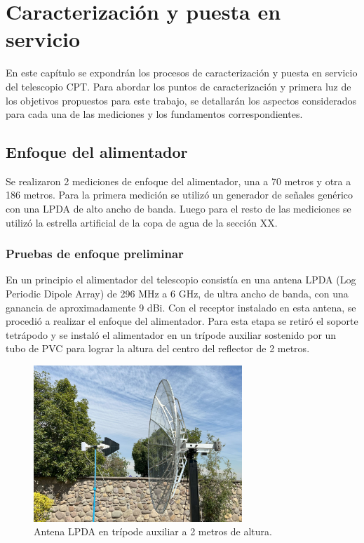 \chapter{Caracterización y puesta en servicio}

En este capítulo se expondrán los procesos de caracterización y puesta en servicio del telescopio CPT. Para abordar los puntos de caracterización y primera luz de los objetivos propuestos para este trabajo, se detallarán los aspectos considerados para cada una de las mediciones y los fundamentos correspondientes.

\section{Enfoque del alimentador}

Se realizaron 2 mediciones de enfoque del alimentador, una a 70 metros y otra a 186 metros. Para la primera medición se utilizó un generador de señales genérico con una LPDA de alto ancho de banda. Luego para el resto de las mediciones se utilizó la estrella artificial de la copa de agua de la sección XX.\\

\subsection{Pruebas de enfoque preliminar}

En un principio el alimentador del telescopio consistía en una antena LPDA (Log Periodic Dipole Array) de 296 MHz a 6 GHz, de ultra ancho de banda, con una ganancia de aproximadamente 9 dBi. Con el receptor instalado en esta antena, se procedió a realizar el enfoque del alimentador. Para esta etapa se retiró el soporte tetrápodo y se instaló el alimentador en un trípode auxiliar sostenido por un tubo de PVC para lograr la altura del centro del reflector de 2 metros.\\

\begin{figure}
    \centering
    \includegraphics[width=0.7\textwidth]{img/enfoque1}
    \caption{Antena LPDA en trípode auxiliar a 2 metros de altura.}
    \label{fig:antena_lpda}
\end{figure}

